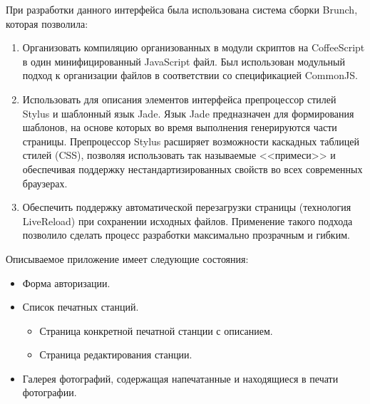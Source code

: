 \documentclass[a4paper,14pt,href]{article}
\begin{document}
При разработки данного интерфейса была использована система сборки Brunch\cite{Brunch}, которая позволила:

\begin{enumerate}
  \item Организовать компиляцию организованных в модули скриптов на CoffeeScript в один минифицированный JavaScript файл.
    Был использован модульный подход к организации файлов в соответствии со спецификацией CommonJS\cite{CommonJS}.

  \item Использовать для описания элементов интерфейса препроцессор стилей Stylus\cite{Stylus} и шаблонный язык
  Jade\cite{JadeLang}. Язык Jade предназначен для формирования шаблонов, на основе которых во время выполнения
  генерируются части страницы. Препроцессор Stylus расширяет возможности каскадных таблицей стилей (CSS), позволяя
  использовать так называемые <<примеси>> и обеспечивая поддержку нестандартизированных свойств во всех современных
  браузерах.

  \item Обеспечить поддержку автоматической перезагрузки страницы (технология LiveReload) при сохранении исходных файлов.
  Применение такого подхода позволило сделать процесс разработки максимально прозрачным и гибким.
\end{enumerate}

Описываемое приложение имеет следующие состояния:
\begin{itemize}
  \item Форма авторизации.

  \item Список печатных станций.
     \begin{itemize}
        \item Страница конкретной печатной станции с описанием.
        \item Страница редактирования станции.
     \end{itemize}

  \item Галерея фотографий, содержащая напечатанные и находящиеся в печати фотографии.
\end{itemize}
\end{document}
